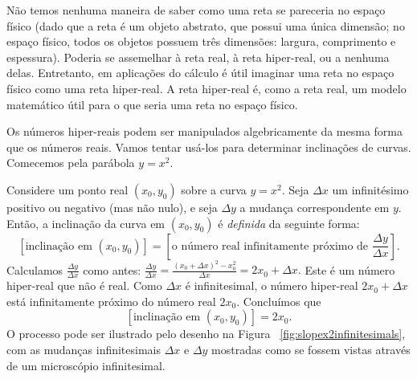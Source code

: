 
Não temos nenhuma maneira de saber como uma reta se pareceria no
espaço físico (dado que a reta é um objeto abstrato, que possui
uma única dimensão; no espaço físico, todos os objetos possuem
três dimensões: largura, comprimento e espessura). Poderia se
assemelhar à reta real, à reta hiper-real, ou a nenhuma delas.
Entretanto, em aplicações do cálculo é útil imaginar uma reta no
espaço físico como uma reta hiper-real. A reta hiper-real é,
como a reta real, um modelo matemático útil para o que seria
uma reta no espaço físico.

Os números hiper-reais podem ser manipulados algebricamente da
mesma forma que os números reais. Vamos tentar usá-los para
determinar inclinações de curvas. Comecemos pela parábola
$y = x^2$.

Considere um ponto real $(x_0,y_0)$ sobre a curva $y = x^2$.
Seja $\Delta x$ um infinitésimo positivo ou negativo (mas
não nulo), e seja $\Delta y$ a mudança correspondente em $y$.
Então, a inclinação da curva em $(x_0,y_0)$ é \emph{definida}
 da seguinte forma:
\[
  [\text{inclinação em } (x_0,y_0)] =
  \left[ \text{o número real infinitamente próximo de } \frac{\Delta y}{\Delta x} \right].
\]
Calculamos $\displaystyle \frac{\Delta y}{\Delta x}$ como antes:
$\displaystyle \frac{\Delta y}{\Delta x} =
\frac{(x_0 + \Delta x)^2 - x_0^2}{\Delta x} = 2x_0 + \Delta x.$
Este é um número hiper-real que não é real. Como $\Delta x$ é
infinitesimal, o número hiper-real $2x_0 + \Delta x$ está
infinitamente próximo do número real $2x_0$. Concluímos que
\[
  [\text{inclinação em } (x_0,y_0)] = 2x_0.
\]
O processo pode ser ilustrado pelo desenho na Figura~%
\ref{fig:slopex2infinitesimals}, com as mudanças
infinitesimais $\Delta x$ e $\Delta y$ mostradas como se
fossem vistas através de um microscópio infinitesimal.



